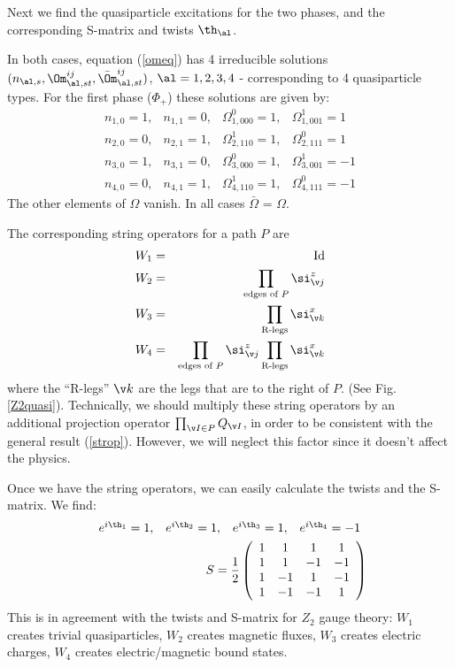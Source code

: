 \documentclass[aps,twocolumn,groupedaddress,showpacs,floatfix]{revtex4}
\begin{document}
Next we find the quasiparticle excitations for the two phases, and
the corresponding S-matrix and twists $\th_\al$.

In both cases, equation (\ref{omeq}) has 4 irreducible
solutions $(n_{\al,s}, \Om^{ij}_{\al,st}, \bar \Om^{ij}_{\al,st})$, 
$\al=1,2,3,4$ - corresponding to 4 quasiparticle types. For the first phase 
($\Phi_{+}$) these solutions are given by:
\begin{displaymath}
\begin{array}{llll}
n_{1,0} = 1, & n_{1,1} = 0, & \Omega^{0}_{1,000} =1,& \Omega^{1}_{1,001} =1 \\ 
n_{2,0} = 0, & n_{2,1} = 1, & \Omega^{1}_{2,110} =1,& \Omega^{0}_{2,111} =1 \\
n_{3,0} = 1, & n_{3,1} = 0, & \Omega^{0}_{3,000} =1,& \Omega^{1}_{3,001} =-1 \\
n_{4,0} = 0, & n_{4,1} = 1, & \Omega^{1}_{4,110} =1,& \Omega^{0}_{4,111} =-1 
\end{array}
\end{displaymath}
The other elements of $\Omega$ vanish. In all cases $\bar{\Omega}$ =
$\Omega$.

The corresponding string operators for a path $P$ are
\begin{eqnarray}
W_{1} &=& \text{Id} \nonumber \\
W_{2} &=& \prod_{\text{edges of } P} \si^z_{\v j} \nonumber \\
W_{3} &=& \prod_{\text{R-legs}} \si^x_{\v k} \nonumber \\
W_{4} &=& \prod_{\text{edges of } P} \si^z_{\v j} \prod_{\text{R-legs}} 
\si^x_{\v k} 
\label{Z2str}
\end{eqnarray}
where the ``R-legs'' $\v k$ are the legs that are to the right of $P$.
(See Fig. \ref{Z2quasi}). Technically, we should multiply these string 
operators by an additional projection operator $\prod_{\v I \in P} Q_{\v I}$, 
in order to be consistent with the general result (\ref{strop}). However, we 
will neglect this factor since it doesn't affect the physics.

Once we have the string operators, we can easily calculate the 
twists and the S-matrix. We find:
\begin{eqnarray}
\begin{array}{llll}
e^{i\th_{1}} = 1, & e^{i\th_{2}} = 1, & e^{i\th_{3}}=1,& e^{i\th_{4}}=-1
\end{array} \\
S = \frac{1}{2}\left ( \begin{array}{cccc}
    1 & 1 & 1 & 1 \\
    1 & 1 & -1 &-1 \\
    1 & -1 & 1 & -1\\
    1 & -1 & -1 & 1 \\
        \end{array} \right )
\end{eqnarray}
This is in agreement with the twists and S-matrix for $Z_2$ gauge theory:
$W_1$ creates trivial quasiparticles, $W_2$ creates magnetic fluxes, 
$W_3$ creates electric charges, $W_4$ creates electric/magnetic bound states.
\end{document}
